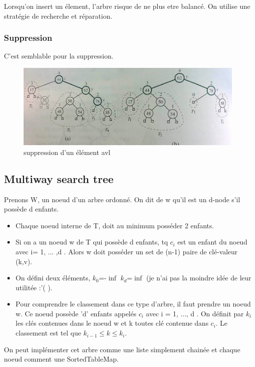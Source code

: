 \documentclass[a4paper]{article}
\begin{document}
Lorsqu'on insert un élement, l'arbre risque de ne plus etre balancé. On utilise une stratégie de recherche et réparation.
\subsubsection{Suppression}
C'est semblable pour la suppression.
\begin{figure}[!h]
\begin{center}
\includegraphics[scale=0.4]{suppressionavl.jpg}
\caption{suppression d'un élément avl}
\end{center}
\end{figure}

\subsection{Multiway search tree}
Prenons W, un noeud d'un arbre ordonné. On dit de w qu'il est un d-node s'il possède d enfants. 
\begin{itemize}
\item Chaque noeud interne de T, doit au minimum posséder 2 enfants.

\item Si on a un noeud w de T qui possède d enfants, tq $c_i$ est un enfant du noeud avec i= 1, ...  ,d . Alors w doit posséder un set de (n-1) paire de clé-valeur (k,v).

\item On défini deux éléments, $k_0$=-$\inf$ $k_d$=$\inf$ (je n'ai pas la moindre idée de leur utilitée :'( ). 
\item Pour comprendre le classement dans ce type d'arbre, il faut prendre un noeud w. Ce noeud possède 'd' enfants appelés $c_i$ avec i = 1, ..., d . On définit par $k_i$ les clés contenues dans le noeud w et k toutes clé contenue dans $c_i$. Le classement est tel que $k_{i-1} \leqslant k \leqslant k_i$.
\end{itemize}

On peut implémenter cet arbre comme une liste simplement chainée et chaque noeud comment une SortedTableMap.
\end{document}
